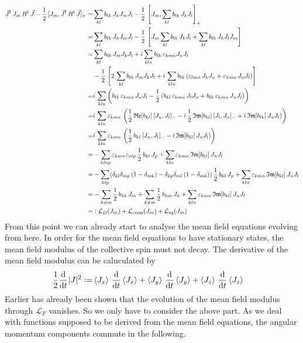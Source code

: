 \documentclass{article}
\begin{document}
\begin{align*}
    \vec{J}^t\,J_m\,B^t\,\vec{J}-\frac{1}{2}\,[J_m,\vec{J}^t\,B^t\,\vec{J}]_+=&\sum_{kl}b_{lk}\,J_k J_m J_l - \frac{1}{2}\,\left[J_m,\sum_{kl}b_{lk}\,J_k J_l\right]_+\\
    =&\sum_{kl}b_{lk}\,J_k J_m J_l - \frac{1}{2}\,\left[J_m\sum_{kl}b_{lk}\,J_k J_l+ \sum_{kl}b_{lk}\,J_k J_l J_m \right]\\
    =&\sum_{kl}b_{lk}\,J_m J_k J_l +i \sum_{kln}b_{lk}\,\varepsilon_{kmn} J_n J_l  \\
    &-\frac{1}{2}\,\left[2\,\sum_{kl}b_{lk}\,J_m J_k J_l + i\,\sum_{kln}b_{lk}\,(\varepsilon_{lmn}\, J_k J_n + \varepsilon_{kmn}\, J_n J_l) \right]\\
    =&i\,\sum_{kln}\left(b_{lk}\,\varepsilon_{kmn} \, J_n J_l - \frac{1}{2}  \,(b_{kl}\, \varepsilon_{kmn}\, J_l J_n + b_{lk}\,\varepsilon_{kmn}\, J_n J_l)    \right)\\
    =& i\,\sum_{kln}\varepsilon_{kmn} \,\left(\frac{1}{2}\,\mathfrak{Re}[b_{kl}]\, [J_n, J_l]_- - i\,\frac{1}{2}  \,\mathfrak{Im}[b_{kl}]\,[J_l, J_n]_- +i\,\mathfrak{Im}[b_{lk}]\, J_n J_l)    \right)\\
    =&i\,\sum_{kln}\varepsilon_{kmn} \,\left(\frac{1}{2}\,b_{kl}\, [J_n, J_l]_-  -i\,\mathfrak{Im}[b_{kl}]\, J_n J_l)    \right)\\
    =&-\sum_{klnp}\varepsilon_{kmn}\varepsilon_{nlp} \,\frac{1}{2}\,b_{kl}\, J_p  +\sum_{kln}\varepsilon_{kmn}\,\mathfrak{Im}[b_{kl}]\, J_n J_l\\
    =&-\sum_{klp}(\delta_{kl}\delta_{mp}\,(1-\delta_{mk})-\delta_{kp}\delta_{ml}\,(1-\delta_{mk})) \,\frac{1}{2}\,b_{kl}\, J_p  +\sum_{kln}\varepsilon_{kmn}\,\mathfrak{Im}[b_{kl}]\, J_n J_l \\
    =&-\sum_{k\neq m}\frac{1}{2}\,b_{kk}\, J_m  + \sum_{k\neq m}\frac{1}{2}\,b_{km}\,J_k+ \sum_{kln}\varepsilon_{kmn}\,\mathfrak{Im}[b_{kl}]\, J_n J_l \\
    =&\vcentcolon\mathcal{L}_{D}(J_m) + \mathcal{L}_{\text{cross}}(J_m) + \mathcal{L}_{sq}(J_m)
\end{align*}
From this point we can already start to analyse the mean field equations evolving from here. In order for the mean field equations to have stationary states, the mean field modulus of the collective spin must not decay. The derivative of the mean field modulus can be caluculated by
\begin{align*}
    \frac{1}{2} \frac{\text{d}}{\text{d}t} |J|^2\vcentcolon=&\braket{J_x}\,\frac{\text{d}}{\text{d}t} \braket{J_x} + \braket{J_y}\,\frac{\text{d}}{\text{d}t} \braket{J_y} + \braket{J_z}\,\frac{\text{d}}{\text{d}t} \braket{J_z} 
\end{align*}
Earlier has already been shown that the evolution of the mean field modulus through $\mathcal{L}_F$ vanishes. So we only have to consider the above part. As we deal with functions supposed to be derived from the mean field equations, the angular momentum components commute in the following.
\end{document}

